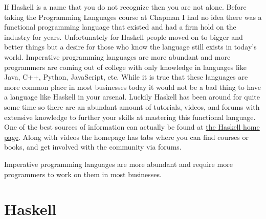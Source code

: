 \documentclass{article}
\begin{document}
\medskip
If Haskell is a name that you do not recognize then you are not alone. Before taking the Programming Languages course at Chapman I had no idea there was a functional programming language that existed and had a firm hold on the industry for years. Unfortunately for Haskell people moved on to bigger and better things but a desire for those who know the language still exists in today's world. Imperative programming languages are more abundant and more programmers are coming out of college with only knowledge in languages like Java, C++, Python, JavaScript, etc. While it is true that these languages are more common place in most businesses today it would not be a bad thing to have a language like Haskell in your arsenal. Luckily Haskell has been around for quite some time so there are an abundant amount of tutorials, videos, and forums with extensive knowledge to further your skills at mastering this functional language. One of the best sources of information can actually be found at \href{https://www.haskell.org/}{the Haskell home page}. Along with videos the homepage has tabs where you can find courses or books, and get involved with the community via forums.

Imperative programming languages are more abundant and require more programmers to work on them in most businesses. 
    
\section{Haskell}\label{haskell}
\end{document}
